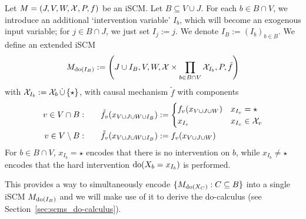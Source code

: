 \begin{Def}\label{def:scm_intervention_variables}
  Let $M = \left ( J, V, W, \mathcal{X}, P, f \right )$ be an iSCM.
  Let $B \subseteq V \cup J$.
  For each $b \in B \cap V$, we introduce an additional `intervention variable' $I_b$, which will become an exogenous input variable; for $j \in B \cap J$, we just set $I_j := j$.
  We denote $I_B := (I_b)_{b \in B}$.
  We define an extended iSCM 
  $$M_{\operatorname{do}(I_B)} := \left ( J \cup I_B, V, W, \mathcal{X} \times \prod_{b \in B \cap V} \mathcal{X}_{I_b}, P, \tilde{f} \right )$$
  with $\mathcal{X}_{I_b} := \mathcal{X}_b \,\dot\cup\, \{\star\}$,
  with causal mechanism $\tilde{f}$ with components
  \begin{align*}
    v \in V \cap B: \qquad &\tilde{f}_v(x_{V \cup J \cup W \cup I_B}) := \begin{cases}
      f_v(x_{V \cup J \cup W}) & x_{I_v} = \star \\
      x_{I_v} & x_{I_v} \in \mathcal{X}_v
    \end{cases}\\
    v \in V \setminus B: \qquad & \tilde{f}_v(x_{V \cup J \cup W \cup I_B}) := f_v(x_{V \cup J \cup W})
  \end{align*}
For $b \in B \cap V$, $x_{I_b} = \star$ encodes that there is no intervention on $b$, while $x_{I_b} \ne \star$ encodes that the hard intervention $\operatorname{do}(X_b = x_{I_b})$ is performed.
\end{Def}
This provides a way to simultaneously encode $\{M_{\operatorname{do}(X_C)} : C \subseteq B\}$ into a single iSCM $M_{\operatorname{do}(I_B)}$ and we will make use of it to derive the do-calculus (see Section~\ref{sec:scms_do-calculus}).

